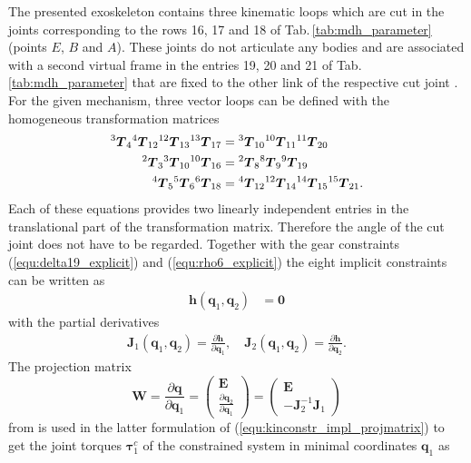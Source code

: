 \documentclass[twocolumn,10pt]{IFTOMM}
\newcommand{\bm}[1]{\boldsymbol{#1}}
\renewcommand{\vec}[1]{\mbox{\boldmath{$#1$}}}
\newcommand{\tmat}[2]{{^{\mathrm{#1}}\vec{T}_{\mathrm{#2}}}}
\begin{document}
The presented exoskeleton contains three kinematic loops which are cut in the joints corresponding to the rows 16, 17 and 18 of Tab.\,\ref{tab:mdh_parameter} (points $E$, $B$ and $A$).
These joints do not articulate any bodies and are associated with a second virtual frame in the entries 19, 20 and 21 of Tab.\,\ref{tab:mdh_parameter} that are fixed to the other link of the respective cut joint \cite{KhalilBen1995,SaminFis2013}.
For the given mechanism, three vector loops can be defined with the homogeneous transformation matrices
%
\begin{align}
\tmat{3}{4} \tmat{4}{12} \tmat{12}{13} \tmat{13}{17} &= \tmat{3}{10} \tmat{10}{11} \tmat{11}{20} \label{equ:implconstr_chain1} \\
\tmat{2}{3} \tmat{3}{10} \tmat{10}{16}  &= \tmat{2}{8} \tmat{8}{9} \tmat{9}{19} \label{equ:implconstr_chain2} \\
\tmat{4}{5} \tmat{5}{6} \tmat{6}{18}  &= \tmat{4}{12} \tmat{12}{14} \tmat{14}{15} \tmat{15}{21}.
\label{equ:implconstr_chain3}
\end{align}
%
Each of these equations provides two linearly independent entries in the translational part of the transformation matrix.
Therefore the angle of the cut joint does not have to be regarded.
Together with the gear constraints (\ref{equ:delta19_explicit}) and (\ref{equ:rho6_explicit}) the eight implicit constraints can be written as
%
\begin{align}
\bm{h}(\bm{q}_1, \bm{q}_2) &= \bm{0} \label{equ:kinconstr_implicit}
\end{align}
%
with the partial derivatives
%
\begin{align}
\bm{J}_1(\bm{q}_1, \bm{q}_2)=\frac{\partial\bm{h}}{\partial \bm{q}_1}, \quad 
\bm{J}_2(\bm{q}_1, \bm{q}_2)=\frac{\partial\bm{h}}{\partial \bm{q}_2}. \label{equ:kinconstr_impl_grad}
\end{align}
%
The projection matrix
%
\begin{equation}
\bm{W} = \frac{\partial \bm{q}}{\partial \bm{q}_1} 
= \begin{pmatrix} \bm{E}\\ \frac{\partial \bm{q}_2}{\partial \bm{q}_1} \end{pmatrix}
= \begin{pmatrix} \bm{E}\\ -\bm{J}_2^{-1}\bm{J}_1 \end{pmatrix}
\label{equ:kinconstr_impl_projmatrix}
\end{equation}
%
from \cite{NakamuraGho1989,ParkChoPlo1999} is used in the latter formulation of (\ref{equ:kinconstr_impl_projmatrix}) to get the joint torques $\bm{\tau}^c_1$ of the constrained system in minimal coordinates $\bm{q}_1$ as
\end{document}
